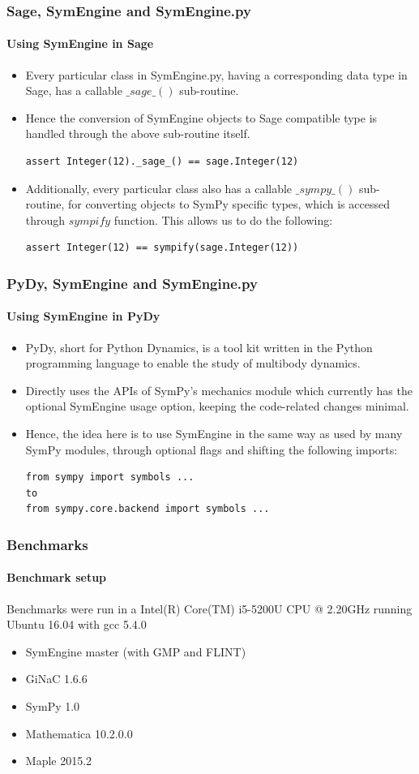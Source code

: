 \documentclass{beamer}
\begin{document}
\begin{frame}[fragile]
\frametitle{Sage, SymEngine and SymEngine.py}
\framesubtitle{Using SymEngine in Sage}
\begin{itemize}
\item Every particular class in SymEngine.py, having a corresponding data type
    in Sage, has a callable $\_sage\_()$  sub-routine.
\item Hence the conversion of SymEngine objects to Sage compatible type is handled
    through the above sub-routine itself.

\begin{verbatim}
assert Integer(12)._sage_() == sage.Integer(12)
\end{verbatim}
\item Additionally, every particular class also has a callable $\_sympy\_()$ sub-routine,
    for converting objects to SymPy specific types, which is accessed through $sympify$
    function. This allows us to do the following:

\begin{verbatim}
assert Integer(12) == sympify(sage.Integer(12))
\end{verbatim}
\end{itemize}
\end{frame}


\begin{frame}[fragile]
\frametitle{PyDy, SymEngine and SymEngine.py}
\framesubtitle{Using SymEngine in PyDy}
\begin{itemize}
\item PyDy, short for Python Dynamics, is a tool kit written in the Python programming language to enable the study of multibody dynamics.
\item Directly uses the APIs of SymPy's mechanics module which currently has the optional SymEngine usage option, keeping the code-related changes minimal.
\item Hence, the idea here is to use SymEngine in the same way as used by many SymPy
modules, through optional flags and shifting the following imports:

\begin{verbatim}
from sympy import symbols ...
to
from sympy.core.backend import symbols ...
\end{verbatim}
\end{itemize}
\end{frame}


\begin{frame}
\frametitle{Benchmarks}
\framesubtitle{Benchmark setup}
Benchmarks were run in a Intel(R) Core(TM) i5-5200U CPU @ 2.20GHz running Ubuntu 16.04 with gcc 5.4.0
\begin{itemize}
 \item SymEngine master (with GMP and FLINT)
 \item GiNaC 1.6.6
 \item SymPy 1.0
 \item Mathematica 10.2.0.0
 \item Maple 2015.2
\end{itemize}
\end{frame}
\end{document}
